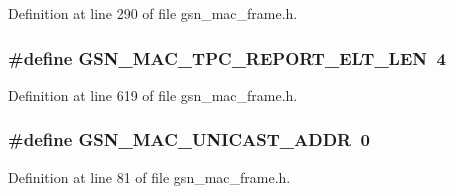 Definition at line 290 of file gsn\_\-mac\_\-frame.h.

\hypertarget{a00523_a8b3dc7a4f3a87ec434c936270ed29efb}{
\subsubsection[{GSN\_\-MAC\_\-TPC\_\-REPORT\_\-ELT\_\-LEN}]{\setlength{\rightskip}{0pt plus 5cm}\#define GSN\_\-MAC\_\-TPC\_\-REPORT\_\-ELT\_\-LEN~4}}
\label{a00523_a8b3dc7a4f3a87ec434c936270ed29efb}


Definition at line 619 of file gsn\_\-mac\_\-frame.h.

\hypertarget{a00523_aa7e63698a5e5d0013d510c5a051a1e91}{
\subsubsection[{GSN\_\-MAC\_\-UNICAST\_\-ADDR}]{\setlength{\rightskip}{0pt plus 5cm}\#define GSN\_\-MAC\_\-UNICAST\_\-ADDR~0}}
\label{a00523_aa7e63698a5e5d0013d510c5a051a1e91}


Definition at line 81 of file gsn\_\-mac\_\-frame.h.

